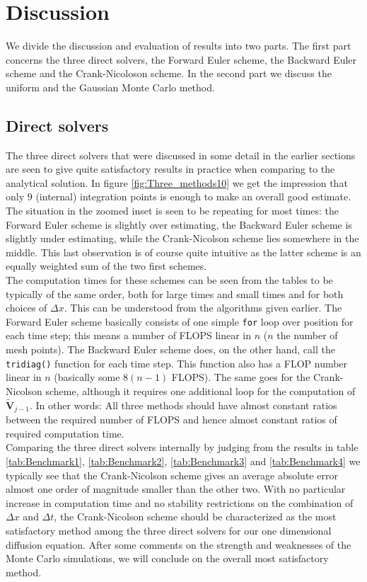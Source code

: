 \documentclass[a4paper, 11pt, notitlepage,english]{article}
\begin{document}
\section{Discussion}
\label{sec:Discuss}
We divide the discussion and evaluation of results into two parts. The first part concerns the three direct solvers, the Forward Euler scheme, the Backward Euler scheme and the Crank-Nicoloson scheme. In the second part we discuss the uniform and the Gaussian Monte Carlo method.

\subsection{Direct solvers}
The three direct solvers that were discussed in some detail in the earlier sections are seen to give quite satisfactory results in practice when comparing to the analytical solution. In figure \ref{fig:Three_methods10} we get the impression that only $9$ (internal) integration points is enough to make an overall good estimate. The situation in the zoomed inset is seen to be repeating for most times: the Forward Euler scheme is slightly over estimating, the Backward Euler scheme is slightly under estimating, while the Crank-Nicolson scheme lies somewhere in the middle. This last observation is of course quite intuitive as the latter scheme is an equally weighted sum of the two first schemes. \\

The computation times for these schemes can be seen from the tables to be typically of the same order, both for large times and small times and for both choices of $\Delta x$. This can be understood from the algorithms given earlier. The Forward Euler scheme basically consists of one simple \texttt{for} loop over position for each time step; this means a number of FLOPS linear in $n$ ($n$ the number of mesh points). The Backward Euler scheme does, on the other hand, call the \texttt{tridiag()} function for each time step. This function also has a FLOP number linear in $n$ (basically some $8(n-1)$ FLOPS). The same goes for the Crank-Nicolson scheme, although it requires one additional loop for the computation of $\tilde{\boldsymbol{V}}_{j-1}$. In other words: All three methods should have almost constant ratios between the required number of FLOPS and hence almost constant ratios of required computation time. \\

Comparing the three direct solvers internally by judging from the results in table \ref{tab:Benchmark1}, \ref{tab:Benchmark2}, \ref{tab:Benchmark3} and \ref{tab:Benchmark4} we typically see that the Crank-Nicolson scheme gives an average absolute error almost one order of magnitude smaller than the other two. With no particular increase in computation time and no stability restrictions on the combination of $\Delta x$ and $\Delta t$, the Crank-Nicolson scheme should be characterized as the most satisfactory method among the three direct solvers for our one dimensional diffusion equation. After some comments on the strength and weaknesses of the Monte Carlo simulations, we will conclude on the overall most satisfactory method. \\
\end{document}
